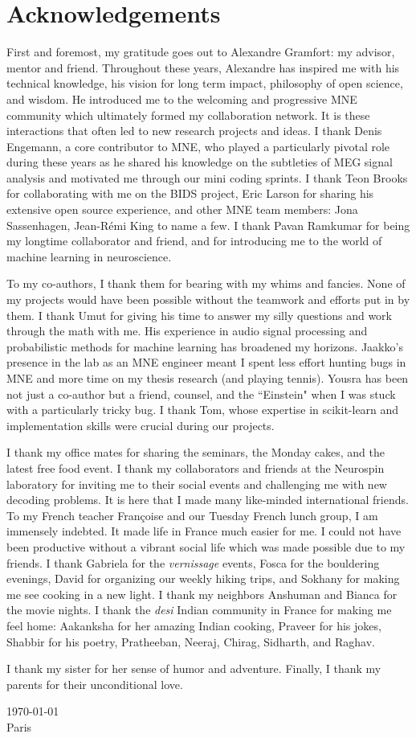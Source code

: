 \chapter*{Acknowledgements}
First and foremost, my gratitude goes out to Alexandre Gramfort: my advisor, mentor and friend. Throughout these years, Alexandre has inspired me with his technical knowledge, his vision for long term impact, philosophy of open science, and wisdom. He introduced me to the welcoming and progressive MNE community which ultimately formed my collaboration network. It is these interactions that often led to new research projects and ideas. I thank Denis Engemann, a core contributor to MNE, who played a particularly pivotal role during these years as he shared his knowledge on the subtleties of MEG signal analysis and motivated me through our mini coding sprints. I thank Teon Brooks for collaborating with me on the BIDS project, Eric Larson for sharing his extensive open source experience, and other MNE team members: Jona Sassenhagen, Jean-Rémi King to name a few. I thank Pavan Ramkumar for being my longtime collaborator and friend, and for introducing me to the world of machine learning in neuroscience.

To my co-authors, I thank them for bearing with my whims and fancies. None of my projects would have been possible without the teamwork and efforts put in by them. I thank Umut for giving his time to answer my silly questions and work through the math with me. His experience in audio signal processing and probabilistic methods for machine learning has broadened my horizons. Jaakko's presence in the lab as an MNE engineer meant I spent less effort hunting bugs in MNE and more time on my thesis research (and playing tennis). Yousra has been not just a co-author but a friend, counsel, and the ``Einstein" when I was stuck with a particularly tricky bug. I thank Tom, whose expertise in scikit-learn and implementation skills were crucial during our projects. 

I thank my office mates for sharing the seminars, the Monday cakes, and the latest free food event. I thank my collaborators and friends at the Neurospin laboratory for inviting me to their social events and challenging me with new decoding problems. It is here that I made many like-minded international friends. To my French teacher Françoise and our Tuesday French lunch group, I am immensely indebted. It made life in France much easier for me. I could not have been productive without a vibrant social life which was made possible due to my friends. I thank Gabriela for the \textit{vernissage} events, Fosca for the bouldering evenings, David for organizing our weekly hiking trips, and Sokhany for making me see cooking in a new light. I thank my neighbors Anshuman and Bianca for the movie nights. I thank the \textit{desi} Indian community in France for making me feel home: Aakanksha for her amazing Indian cooking, Praveer for his jokes, Shabbir for his poetry, Pratheeban, Neeraj, Chirag, Sidharth, and Raghav.

I thank my sister for her sense of humor and adventure. Finally, I thank my parents for their unconditional love.

\today \\
Paris
